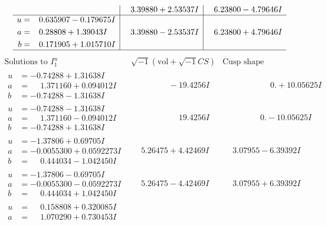 \documentclass[1p]{elsarticle_modified}
\theoremstyle{definition}
\newcommand{\I}{\sqrt{-1}}
\begin{document}
$$\begin{array}{c|c|c}
 & \phantom{-}3.39880 + 2.53537 I & \phantom{-}6.23800 - 4.79646 I \\ \hline\begin{aligned}
u &= \phantom{-}0.635907 - 0.179675 I \\
a &= \phantom{-}0.28808 + 1.39043 I \\
b &= \phantom{-}0.171905 + 1.015710 I\end{aligned}
 & \phantom{-}3.39880 - 2.53537 I & \phantom{-}6.23800 + 4.79646 I\\
 \hline 
 \end{array}$$\newpage$$\begin{array}{c|c|c}  
\text{Solutions to }I^u_{1}& \I (\text{vol} + \sqrt{-1}CS) & \text{Cusp shape}\\
 \hline 
\begin{aligned}
u &= -0.74288 + 1.31638 I \\
a &= \phantom{-}1.371160 + 0.094012 I \\
b &= -0.74288 - 1.31638 I\end{aligned}
 & \phantom{-0.000000 } -19.4256 I & \phantom{-0.000000 -}0. + 10.05625 I \\ \hline\begin{aligned}
u &= -0.74288 - 1.31638 I \\
a &= \phantom{-}1.371160 - 0.094012 I \\
b &= -0.74288 + 1.31638 I\end{aligned}
 & \phantom{-0.000000 -}19.4256 I & \phantom{-0.000000 } 0. - 10.05625 I \\ \hline\begin{aligned}
u &= -1.37806 + 0.69705 I \\
a &= -0.0055300 + 0.0592273 I \\
b &= \phantom{-}0.444034 - 1.042450 I\end{aligned}
 & \phantom{-}5.26475 + 4.42469 I & \phantom{-}3.07955 - 6.39392 I \\ \hline\begin{aligned}
u &= -1.37806 - 0.69705 I \\
a &= -0.0055300 - 0.0592273 I \\
b &= \phantom{-}0.444034 + 1.042450 I\end{aligned}
 & \phantom{-}5.26475 - 4.42469 I & \phantom{-}3.07955 + 6.39392 I \\ \hline\begin{aligned}
u &= \phantom{-}0.158808 + 0.320085 I \\
a &= \phantom{-}1.070290 + 0.730453 I \\

\end{aligned}
\end{array}$$
\end{document}
